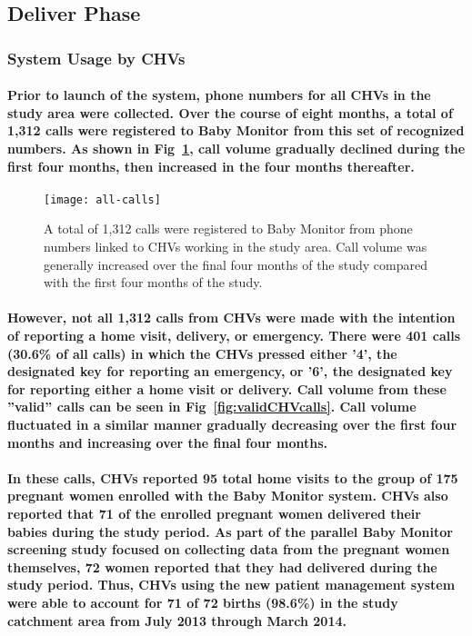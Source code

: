 \subsection{Deliver Phase}

\subsubsection{System Usage by CHVs}
\paragraph{Prior to launch of the system, phone numbers for all CHVs in the study area were collected. Over the course of eight months, a total of 1,312 calls were registered to Baby Monitor from this set of recognized numbers. As shown in Fig~\ref{fig:allCHVcalls}, call volume gradually declined during the first four months, then increased in the four months thereafter.}

\begin{figure}[h]
	\begin{center}
	\texttt{[image: all-calls]}
	\end{center}
	\caption[All CHV Calls]{A total of 1,312 calls were registered to Baby Monitor from phone numbers linked to CHVs working in the study area. Call volume was generally increased over the final four months of the study compared with the first four months of the study.}
	\label{fig:allCHVcalls}
\end{figure}

\paragraph{However, not all 1,312 calls from CHVs were made with the intention of reporting a home visit, delivery, or emergency. There were 401 calls (30.6\% of all calls) in which the CHVs pressed either '4', the designated key for reporting an emergency, or '6', the designated key for reporting either a home visit or delivery. Call volume from these ''valid'' calls can be seen in Fig~\ref{fig:validCHVcalls}. Call volume fluctuated in a similar manner gradually decreasing over the first four months and increasing over the final four months.}

\paragraph{ In these calls, CHVs reported 95 total home visits to the group of 175 pregnant women enrolled with the Baby Monitor system. CHVs also reported that 71 of the enrolled pregnant women delivered their babies during the study period. As part of the parallel Baby Monitor screening study focused on collecting data from the pregnant women themselves, 72 women reported that they had delivered during the study period. Thus, CHVs using the new patient management system were able to account for 71 of 72 births (98.6\%) in the study catchment area from July 2013 through March 2014. }

